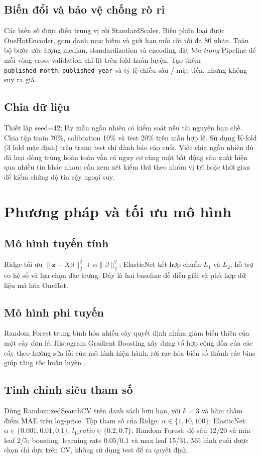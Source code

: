 \documentclass[12pt,a4paper]{report}
\begin{document}
\section{Biến đổi và bảo vệ chống rò rỉ}
Các biến số được điền trung vị rồi StandardScaler. Biến phân loại được OneHotEncoder, gom danh mục hiếm và giới hạn mỗi cột tối đa 80 nhãn. Toàn bộ bước ước lượng median, standardization và encoding đặt \emph{bên trong} Pipeline để mỗi vòng cross-validation chỉ fit trên fold huấn luyện. Tạo thêm \texttt{published\_month}, \texttt{published\_year} và tỷ lệ chiều sâu / mặt tiền, nhưng không suy ra giá.
\section{Chia dữ liệu}
Thiết lập seed=42; lấy mẫu ngẫu nhiên có kiểm soát nếu tài nguyên hạn chế. Chia tập train 70\%, calibration 10\% và test 20\% trên mẫu hợp lệ. Sử dụng K-fold (3 fold mặc định) trên train; test chỉ dành báo cáo cuối. Việc chia ngẫu nhiên dù đã loại dòng trùng hoàn toàn vẫn có nguy cơ cùng một bất động sản xuất hiện qua nhiều tin khác nhau: cần xem xét kiểm thử theo nhóm vị trí hoặc thời gian để kiểm chứng độ tin cậy ngoại suy.
\chapter{Phương pháp và tối ưu mô hình}
\section{Mô hình tuyến tính}
Ridge tối ưu $\|\mathbf{z}-X\beta\|_2^2+\alpha\|\beta\|_2^2$; ElasticNet kết hợp chuẩn $L_1$ và $L_2$, hỗ trợ co hệ số và lựa chọn đặc trưng. Đây là hai baseline dễ diễn giải và phù hợp dữ liệu mã hóa OneHot.
\section{Mô hình phi tuyến}
Random Forest trung bình hóa nhiều cây quyết định nhằm giảm biến thiên của một cây đơn lẻ. Histogram Gradient Boosting xây dựng tổ hợp cộng dồn của các cây theo hướng sửa lỗi của mô hình hiện hành, rời rạc hóa biến số thành các bins giúp tăng tốc huấn luyện \cite{hastie,sklearn}.
\section{Tinh chỉnh siêu tham số}
Dùng RandomizedSearchCV trên danh sách hữu hạn, với $k=3$ và hàm chấm điểm MAE trên log-price. Tập tham số của Ridge: $\alpha\in\{1,10,100\}$; ElasticNet: $\alpha\in\{0.001,0.01,0.1\}$, $l_1\_ratio\in\{0.2,0.7\}$; Random Forest: độ sâu 12/20 và min leaf 2/5; boosting: learning rate 0.05/0.1 và max leaf 15/31. Mô hình cuối được chọn chỉ dựa trên CV, không sử dụng test để ra quyết định.
\end{document}
